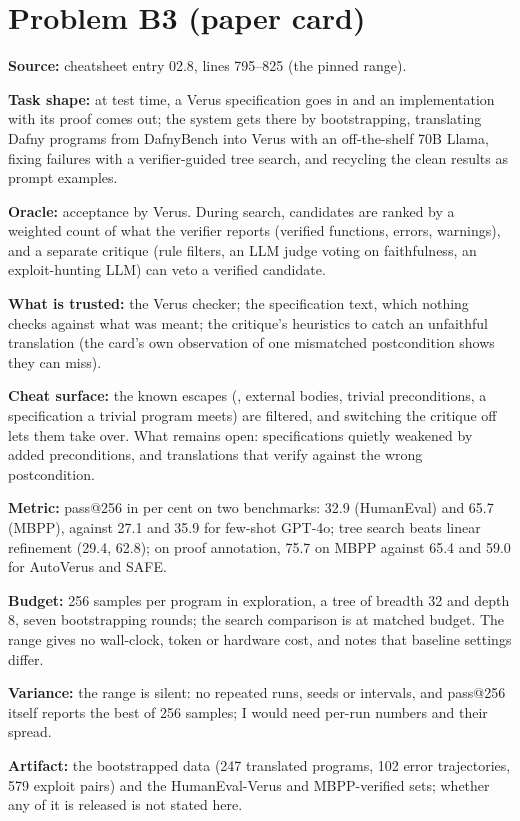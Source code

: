 \documentclass[11pt]{article}
\begin{document}
\section*{Problem B3 (paper card)}\label{ans:B3}
\begin{answer}
\textbf{Source:} cheatsheet entry 02.8, lines 795--825 (the pinned range).

\textbf{Task shape:} at test time, a Verus specification goes in and an
implementation with its proof comes out; the system gets there by
bootstrapping, translating Dafny programs from DafnyBench into Verus with an
off-the-shelf 70B Llama, fixing failures with a verifier-guided tree search,
and recycling the clean results as prompt examples.

\textbf{Oracle:} acceptance by Verus. During search, candidates are ranked by
a weighted count of what the verifier reports (verified functions, errors,
warnings), and a separate critique (rule filters, an LLM judge voting on
faithfulness, an exploit-hunting LLM) can veto a verified candidate.

\textbf{What is trusted:} the Verus checker; the specification text, which
nothing checks against what was meant; the critique's heuristics to catch an
unfaithful translation (the card's own observation of one mismatched
postcondition shows they can miss).

\textbf{Cheat surface:} the known escapes (, external
bodies, trivial preconditions, a specification a trivial program meets) are
filtered, and switching the critique off lets them take over. What remains
open: specifications quietly weakened by added preconditions, and
translations that verify against the wrong postcondition.

\textbf{Metric:} pass@256 in per cent on two benchmarks: 32.9 (HumanEval)
and 65.7 (MBPP), against 27.1 and 35.9 for few-shot GPT-4o; tree search beats
linear refinement (29.4, 62.8); on proof annotation, 75.7 on MBPP against
65.4 and 59.0 for AutoVerus and SAFE.

\textbf{Budget:} 256 samples per program in exploration, a tree of breadth 32
and depth 8, seven bootstrapping rounds; the search comparison is at matched
budget. The range gives no wall-clock, token or hardware cost, and notes that
baseline settings differ.

\textbf{Variance:} the range is silent: no repeated runs, seeds or intervals,
and pass@256 itself reports the best of 256 samples; I would need per-run
numbers and their spread.

\textbf{Artifact:} the bootstrapped data (247 translated programs, 102 error
trajectories, 579 exploit pairs) and the HumanEval-Verus and MBPP-verified
sets; whether any of it is released is not stated here.
\end{answer}
\end{document}
